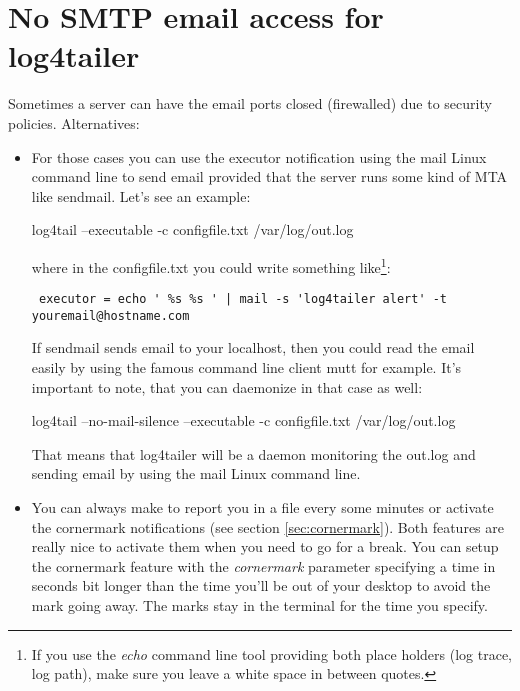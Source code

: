 \section{No SMTP email access for log4tailer}
Sometimes a server can have the email ports closed (firewalled) due to security policies. 
Alternatives:
\begin{itemize}
\item For those cases you can use the executor notification using the mail Linux command line to 
send email provided that the server runs some 
kind of MTA like sendmail. Let's see an example:
\begin{cmd}
 log4tail --executable -c configfile.txt /var/log/out.log
\end{cmd}
where in the configfile.txt you could write something like\footnote{If you use the 
\emph{echo} command line tool providing both place holders (log trace, log path), make 
sure you leave a white space in between quotes.}:

\begin{config}
\begin{verbatim}
 executor = echo ' %s %s ' | mail -s 'log4tailer alert' -t youremail@hostname.com
\end{verbatim}
\end{config}

If sendmail sends email to your localhost, then you could read the email easily by using the 
famous command line client mutt for example. It's important to note, that you can daemonize 
\logftailer{} in that case as well:
\begin{cmd}
 log4tail --no-mail-silence --executable -c configfile.txt /var/log/out.log
\end{cmd}
That means that log4tailer will be a daemon monitoring the out.log and sending email by using 
the mail Linux command line. 

\item You can always make \logftailer{} to report you in a file every some minutes or 
activate the cornermark notifications (see section \ref{sec:cornermark}). 
Both features are really nice to activate them when 
you need to go for a break. You can setup the cornermark feature with the \emph{cornermark}
parameter specifying a time in seconds bit longer than the time you'll be out of your desktop
to avoid the mark going away. The marks stay in the terminal for the time you specify.
\end{itemize}


\newpage

